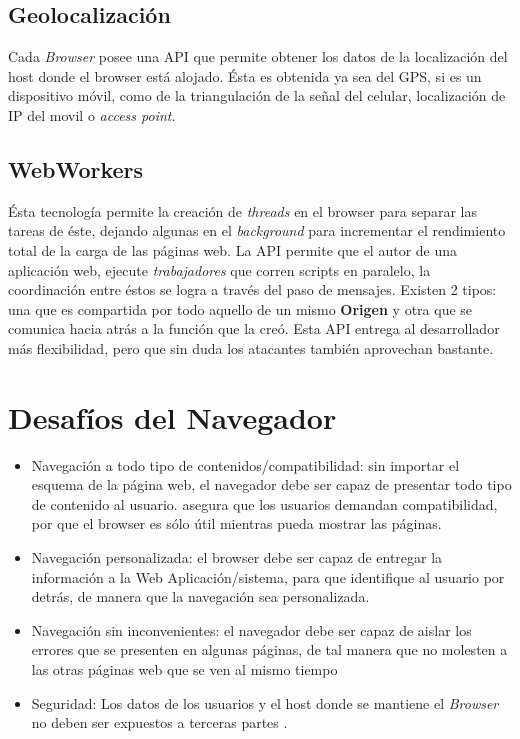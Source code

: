     \subsection{Geolocalización}
    Cada \textit{Browser} posee una API que permite obtener los datos de la localización del host donde el browser está alojado. Ésta es obtenida ya sea del GPS, si es un dispositivo móvil, como de la triangulación de la señal del celular, localización de IP del movil o \textit{access point}.

    \subsection{WebWorkers}
    \label{chap2:WWs}
    Ésta tecnología permite la creación de \textit{threads} en el browser para separar las tareas de éste, dejando algunas en el \textit{background} para incrementar el rendimiento total de la carga de las páginas web. La API permite que el autor de una aplicación web, ejecute \textit{trabajadores} que corren scripts en paralelo, la coordinación entre éstos se logra a través del paso de mensajes. Existen 2 tipos: una que es compartida por todo aquello de un mismo \textbf{Origen} y otra que se comunica hacia atrás a la función que la creó. Esta API entrega al desarrollador más flexibilidad, pero que sin duda los atacantes también aprovechan bastante.


\section{Desafíos del Navegador}
    \label{chap2:Desafios}
    \begin{itemize}
        \item Navegación a todo tipo de contenidos/compatibilidad: sin importar el esquema de la página web, el navegador debe ser capaz de presentar todo tipo de contenido al usuario. \cite{barth2008security} asegura que los usuarios demandan compatibilidad, por que el browser es sólo útil mientras pueda mostrar las páginas.
        \item Navegación personalizada: el browser debe ser capaz de entregar la información a la Web Aplicación/sistema, para que identifique al usuario por detrás, de manera que la navegación sea personalizada.
        \item Navegación sin inconvenientes: el navegador debe ser capaz de aislar los errores que se presenten en algunas páginas, de tal manera que no molesten a las otras páginas web que se ven al mismo tiempo \cite{IE8-LCIE, preprint-grosskurth-browser-archevol, barth2008security}
        \item Seguridad: Los datos de los usuarios y el host donde se mantiene el \textit{Browser} no deben ser expuestos a terceras partes \cite{Reis2009, barth2009securing, Barth2010, Liu2012, barth2009attacks, Saini2014}.
    \end{itemize}


